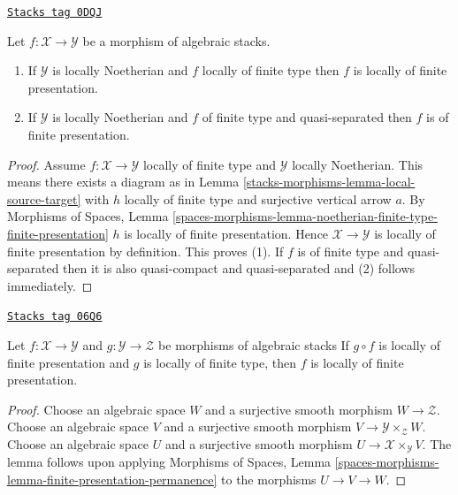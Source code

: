 \begin{lemma}
\label{stacks-morphisms-lemma-noetherian-finite-type-finite-presentation}
\href{https://stacks.math.columbia.edu/tag/0DQJ}{\texttt{Stacks tag 0DQJ}}

Let $f : \mathcal{X} \to \mathcal{Y}$ be a morphism of algebraic stacks.
\begin{enumerate}
\item If $\mathcal{Y}$ is locally Noetherian and $f$ locally of finite type
then $f$ is locally of finite presentation.
\item If $\mathcal{Y}$ is locally Noetherian and $f$ of finite type and
quasi-separated then $f$ is of finite presentation.
\end{enumerate}
\end{lemma}

\begin{proof}
Assume $f : \mathcal{X} \to \mathcal{Y}$
locally of finite type and $\mathcal{Y}$ locally Noetherian.
This means there exists a diagram as in
Lemma \ref{stacks-morphisms-lemma-local-source-target}
with $h$ locally of finite type and surjective vertical arrow $a$. By
Morphisms of Spaces, Lemma
\ref{spaces-morphisms-lemma-noetherian-finite-type-finite-presentation}
$h$ is locally of finite presentation.
Hence $\mathcal{X} \to \mathcal{Y}$
is locally of finite presentation by definition.
This proves (1).
If $f$ is of finite type and quasi-separated then it is also
quasi-compact and quasi-separated and (2) follows immediately.
\end{proof}

\begin{lemma}
\label{stacks-morphisms-lemma-finite-presentation-permanence}
\href{https://stacks.math.columbia.edu/tag/06Q6}{\texttt{Stacks tag 06Q6}}

Let $f : \mathcal{X} \to \mathcal{Y}$ and
$g : \mathcal{Y} \to \mathcal{Z}$ be morphisms of algebraic stacks
If $g \circ f$ is locally of finite presentation and $g$ is locally of
finite type, then $f$ is locally of finite presentation.
\end{lemma}

\begin{proof}
Choose an algebraic space $W$ and a surjective smooth morphism
$W \to \mathcal{Z}$.
Choose an algebraic space $V$ and a surjective smooth morphism
$V \to \mathcal{Y} \times_\mathcal{Z} W$.
Choose an algebraic space $U$ and a surjective smooth morphism
$U \to \mathcal{X} \times_\mathcal{Y} V$.
The lemma follows upon applying
Morphisms of Spaces, Lemma
\ref{spaces-morphisms-lemma-finite-presentation-permanence}
to the morphisms $U \to V \to W$.
\end{proof}

